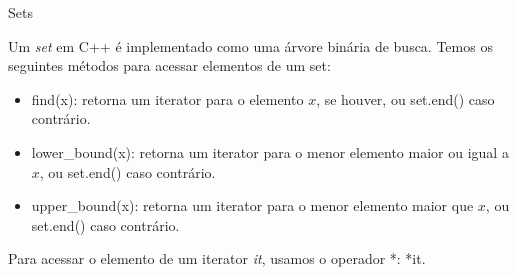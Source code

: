\begin{frame}{Sets}

    Um \textit{set} em C++ é implementado como uma árvore binária de busca. Temos os seguintes métodos para acessar elementos de um set:

    \begin{itemize}
        \item find(x): retorna um iterator para o elemento $x$, se houver, ou set.end() caso contrário.
        \item lower\_bound(x): retorna um iterator para o menor elemento maior ou igual a $x$, ou set.end() caso contrário.    
        \item upper\_bound(x): retorna um iterator para o menor elemento maior que $x$, ou set.end() caso contrário.
    \end{itemize}

    Para acessar o elemento de um iterator \textit{it}, usamos o operador *: *it.

\end{frame}